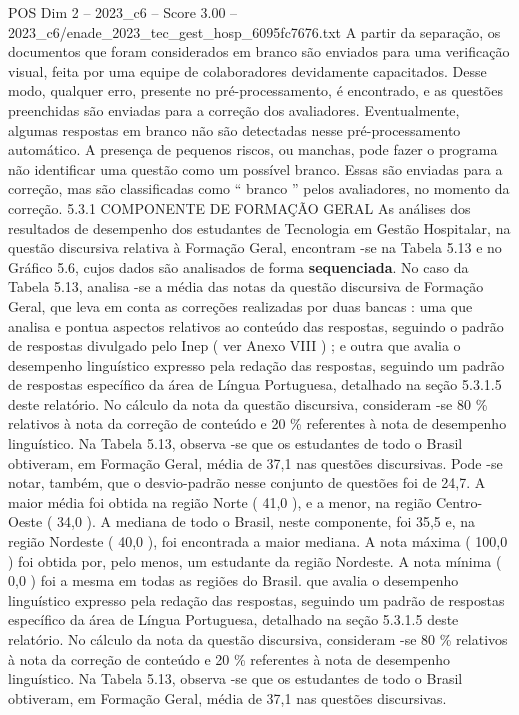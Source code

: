 \begin{textsample}{POS Dim 2 – 2023\_c6 – Score 3.00 – 2023\_c6/enade\_2023\_tec\_gest\_hosp\_6095fc7676.txt}
A partir da separação, os documentos que foram considerados em branco são enviados para uma verificação visual, feita por uma equipe de colaboradores devidamente capacitados.
Desse modo, qualquer erro, presente no pré-processamento, é encontrado, e as questões preenchidas são enviadas para a correção dos avaliadores.
Eventualmente, algumas respostas em branco não são detectadas nesse pré-processamento automático.
A presença de pequenos riscos, ou manchas, pode fazer o programa não identificar uma questão como um possível branco.
Essas são enviadas para a correção, mas são classificadas como “ branco ” pelos avaliadores, no momento da correção. 5.3.1 COMPONENTE DE FORMAÇÃO GERAL As análises dos resultados de desempenho dos estudantes de Tecnologia em Gestão Hospitalar, na questão discursiva relativa à Formação Geral, encontram -se na Tabela 5.13 e no Gráfico 5.6, cujos dados são analisados de forma \textbf{sequenciada}.
No caso da Tabela 5.13, analisa -se a média das notas da questão discursiva de Formação Geral, que leva em conta as correções realizadas por duas bancas : uma que analisa e pontua aspectos relativos ao conteúdo das respostas, seguindo o padrão de respostas divulgado pelo Inep ( ver Anexo VIII ) ; e outra que avalia o desempenho linguístico expresso pela redação das respostas, seguindo um padrão de respostas específico da área de Língua Portuguesa, detalhado na seção 5.3.1.5 deste relatório.
No cálculo da nota da questão discursiva, consideram -se 80 \% relativos à nota da correção de conteúdo e 20 \% referentes à nota de desempenho linguístico.
Na Tabela 5.13, observa -se que os estudantes de todo o Brasil obtiveram, em Formação Geral, média de 37,1 nas questões discursivas.
Pode -se notar, também, que o desvio-padrão nesse conjunto de questões foi de 24,7.
A maior média foi obtida na região Norte ( 41,0 ), e a menor, na região Centro-Oeste ( 34,0 ).
A mediana de todo o Brasil, neste componente, foi 35,5 e, na região Nordeste ( 40,0 ), foi encontrada a maior mediana.
A nota máxima ( 100,0 ) foi obtida por, pelo menos, um estudante da região Nordeste.
A nota mínima ( 0,0 ) foi a mesma em todas as regiões do Brasil. que avalia o desempenho linguístico expresso pela redação das respostas, seguindo um padrão de respostas específico da área de Língua Portuguesa, detalhado na seção 5.3.1.5 deste relatório.
No cálculo da nota da questão discursiva, consideram -se 80 \% relativos à nota da correção de conteúdo e 20 \% referentes à nota de desempenho linguístico.
Na Tabela 5.13, observa -se que os estudantes de todo o Brasil obtiveram, em Formação Geral, média de 37,1 nas questões discursivas.

\end{textsample}
